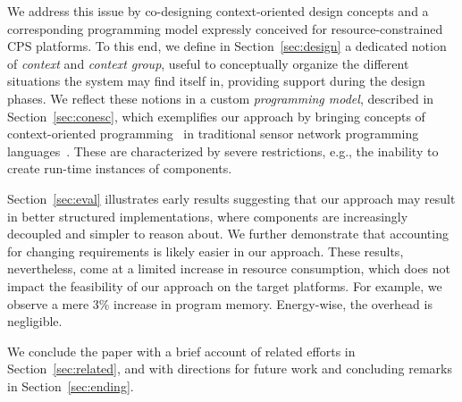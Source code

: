We address this issue by co-designing context-oriented design concepts
and a corresponding programming model expressly conceived for
resource-constrained CPS platforms. To this end, we define in
Section~\ref{sec:design} a dedicated notion of \emph{context} and
\emph{context group}, useful to conceptually organize the different
situations the system may find itself in, providing support during the
design phases. We reflect these notions in a custom \emph{programming
  model}, described in Section~\ref{sec:conesc}, which exemplifies our
approach by bringing concepts of context-oriented
programming~\cite{cop} in traditional sensor network programming
languages~\cite{nesc}. These are characterized by severe restrictions,
e.g., the inability to create run-time instances of components.

Section~\ref{sec:eval} illustrates early results suggesting that our
approach may result in better structured implementations, where
components are increasingly decoupled and simpler to reason about. We
further demonstrate that accounting for changing requirements is
likely easier in our approach. These results, nevertheless, come at a
limited increase in resource consumption, which does not impact the
feasibility of our approach on the target platforms. For example, we
observe a mere 3\% increase in program memory. Energy-wise, the
overhead is negligible.

We conclude the paper with a brief account of related efforts in
Section~\ref{sec:related}, and with directions for future work and
concluding remarks in Section~\ref{sec:ending}.







